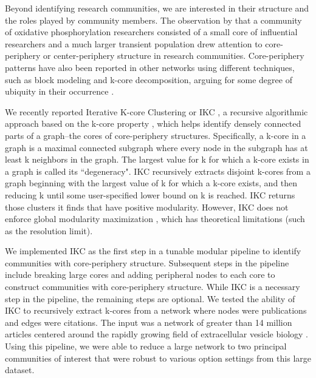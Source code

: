 \documentclass[12pt, oneside]{article}   	%
\begin{document}
Beyond identifying research communities, we are interested in their structure and the roles played by community members.  The observation by \cite{Price1966} that a community of oxidative phosphorylation researchers consisted of a small core of influential researchers and a much larger transient population drew attention to core-periphery or center-periphery structure in research communities. Core-periphery patterns have also been reported in other networks using different techniques, such as block modeling and k-core decomposition, arguing for some degree of ubiquity in their occurrence \citep{borgatti2000models,Breiger2014,Zhang2015,Rombach2017,gallagher2021clarified,yanchenko_2202.04455}. 	

We recently reported Iterative K-core Clustering or IKC \citep{Wedell2022}, a recursive algorithmic approach based on the k-core property \citep{Giatsidis2011,malliaros2019}, which helps identify densely connected parts of a graph--the cores of core-periphery structures. 
Specifically, a k-core in a graph is a maximal connected subgraph where every node in the subgraph has at least k neighbors in the graph.
The largest value for k for which a k-core exists in a graph is called its ``degeneracy". 
IKC recursively extracts disjoint k-cores from a graph beginning with the largest value of k for which a  k-core  exists, and then reducing k until some user-specified lower bound on k is reached. 
IKC returns those clusters it finds that have positive modularity. 
However, 
IKC does not enforce global modularity maximization \citep{lancichinetti2011limits}, which has theoretical limitations (such as the resolution limit). 

We implemented IKC as the first step in a tunable modular pipeline to identify communities with core-periphery structure. 
Subsequent steps in the pipeline include breaking large cores and adding peripheral nodes to each core to construct communities with core-periphery structure. While IKC is a necessary step in the pipeline, the remaining steps are optional. We tested the ability of IKC to recursively extract k-cores from a network where nodes were publications and edges were citations. 
The input was a network of greater than 14 million articles centered around the rapidly growing field of extracellular vesicle biology \citep{Wedell2022}. Using this pipeline, we were able to reduce a large network to two principal communities of interest that were robust to various option settings \citep[Figure 5]{Wedell2022} from this large dataset.
	
\end{document}

